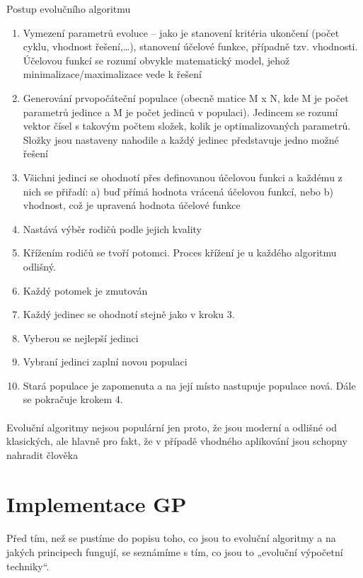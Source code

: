 \documentclass[bc,male,java,dept460]{diploma}		%
\begin{document}
\begin{example}
\label{priklad}
Postup evolučního algoritmu
\begin{enumerate}
\item Vymezení parametrů evoluce – jako je stanovení kritéria ukončení (počet cyklu, vhodnost řešení,…), stanovení účelové funkce, případně tzv. vhodnosti. Účelovou funkcí se rozumí obvykle matematický model, jehož minimalizace/maximalizace vede k řešení
\item Generování prvopočáteční populace (obecně matice M x N, kde M je počet parametrů jedince a M je počet jedinců v populaci). Jedincem se rozumí vektor čísel s takovým počtem složek, kolik je optimalizovaných parametrů. Složky jsou nastaveny nahodile a každý jedinec představuje jedno možné řešení
\item Všichni jedinci se ohodnotí přes definovanou účelovou funkci a každému z nich se přiřadí: a) buď přímá hodnota vrácená účelovou funkcí, nebo b) vhodnost, což je upravená hodnota účelové funkce
\item Nastává výběr rodičů podle jejich kvality
\item Křížením rodičů se tvoří potomci. Proces křížení je u každého algoritmu odlišný.
\item Každý potomek je zmutován
\item Každý jedinec se ohodnotí stejně jako v kroku 3.
\item Vyberou se nejlepší jedinci
\item Vybraní jedinci zaplní novou populaci
\item Stará populace je zapomenuta a na její místo nastupuje populace nová. Dále se pokračuje krokem 4.
\end{enumerate}
\paragraph*{}
Evoluční algoritmy nejsou populární jen proto, že jsou moderní a odlišné od klasických, ale hlavně pro fakt, že v případě vhodného aplikování jsou schopny nahradit člověka
\end{example}

\section{Implementace GP}
\paragraph*{}
Před tím, než se pustíme do popisu toho, co jsou to evoluční algoritmy a na jakých principech fungují, se seznámíme s tím, co jsou to „evoluční výpočetní techniky“.
\end{document}
